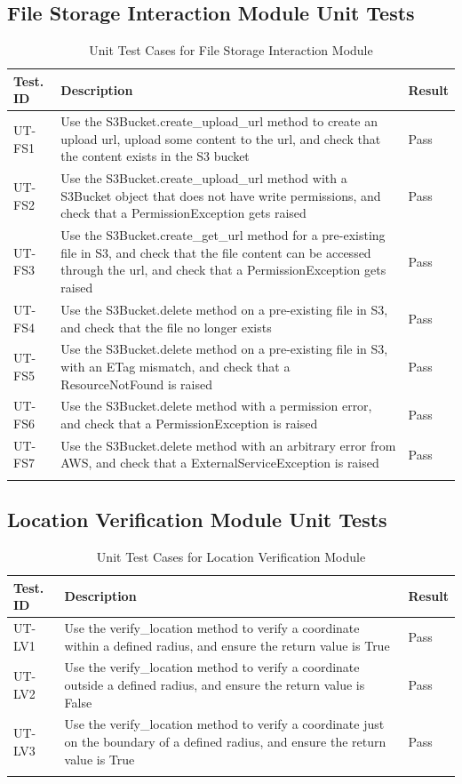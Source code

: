\documentclass[12pt, titlepage]{article}
\begin{document}
\subsection{File Storage Interaction Module Unit Tests}

\begin{longtable}{|m{2cm}|m{10cm}|m{1.4cm}|}
  \hline
  \textbf{Test. ID} & \textbf{Description} & \textbf{Result} \\ \hline
  UT-FS1 & Use the S3Bucket.create\_upload\_url method to create an
  upload url, upload some content to the url, and check that the
  content exists in the S3 bucket & Pass\\ \hline
  UT-FS2 & Use the S3Bucket.create\_upload\_url method with a
  S3Bucket object that does not have write permissions, and check
  that a PermissionException gets raised & Pass\\ \hline
  UT-FS3 & Use the S3Bucket.create\_get\_url method for a
  pre-existing file in S3, and check that the file content can be
  accessed through the url, and check that a PermissionException gets
  raised & Pass\\ \hline
  UT-FS4 & Use the S3Bucket.delete method on a pre-existing file in
  S3, and check that the file no longer exists & Pass\\ \hline
  UT-FS5 & Use the S3Bucket.delete method on a pre-existing file in
  S3, with an ETag mismatch, and check that a ResourceNotFound is
  raised & Pass\\ \hline
  UT-FS6 & Use the S3Bucket.delete method with a permission error,
  and check that a PermissionException is raised & Pass\\ \hline
  UT-FS7 & Use the S3Bucket.delete method with an arbitrary error
  from AWS, and check that a ExternalServiceException is raised & Pass\\ \hline
  \caption{Unit Test Cases for File Storage Interaction Module}
\end{longtable}

\subsection{Location Verification Module Unit Tests}

\begin{longtable}{|m{2cm}|m{10cm}|m{1.4cm}|}
  \hline
  \textbf{Test. ID} & \textbf{Description} & \textbf{Result} \\ \hline
  UT-LV1 & Use the verify\_location method to verify a coordinate
  within a defined radius, and ensure the return value is True & Pass\\ \hline
  UT-LV2 & Use the verify\_location method to verify a coordinate
  outside a defined radius, and ensure the return value is False & Pass\\ \hline
  UT-LV3 & Use the verify\_location method to verify a coordinate
  just on the boundary of a defined radius, and ensure the return
  value is True & Pass\\ \hline
  \caption{Unit Test Cases for Location Verification Module}
\end{longtable}
\end{document}
